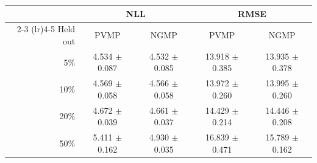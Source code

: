 \begin{tabular}{rcccc}
\toprule
 & \multicolumn{2}{c}{NLL} & \multicolumn{2}{c}{RMSE} \\
\cmidrule(lr){2-3} \cmidrule(lr){4-5}
Held out & PVMP & NGMP & PVMP & NGMP \\
\midrule
5\% & 4.534 $\pm$ 0.087 & 4.532 $\pm$ 0.085 & 13.918 $\pm$ 0.385 & 13.935 $\pm$ 0.378 \\
10\% & 4.569 $\pm$ 0.058 & 4.566 $\pm$ 0.058 & 13.972 $\pm$ 0.260 & 13.995 $\pm$ 0.260 \\
20\% & 4.672 $\pm$ 0.039 & 4.661 $\pm$ 0.037 & 14.429 $\pm$ 0.214 & 14.446 $\pm$ 0.208 \\
50\% & 5.411 $\pm$ 0.162 & 4.930 $\pm$ 0.035 & 16.839 $\pm$ 0.471 & 15.789 $\pm$ 0.162 \\
\bottomrule
\end{tabular}
